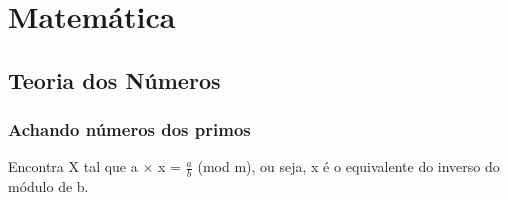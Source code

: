 \section{Matemática}

\subsection{Teoria dos Números}


\subsubsection{Achando números dos primos}
Encontra X tal que a $\times$ x = $\frac{a}{b}$ (mod m), ou seja, x é o equivalente do inverso do módulo de b.
\divisor

